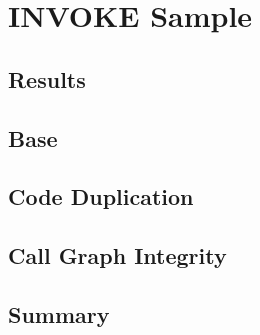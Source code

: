 \section{INVOKE Sample}

\subsection*{Results}

\subsection{Base}

\subsection{Code Duplication}

\subsection{Call Graph Integrity}

\subsection{Summary}


